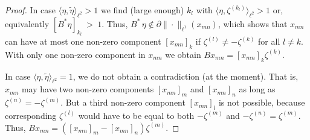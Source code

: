 \documentclass[10pt,a4paper]{amsart}
\begin{document}
\begin{proof}
\par
In case $\langle\eta,\tilde{\eta}\rangle_{\ell^2}>1$ we find (large enough) $k_l$ with $\langle\eta,\zeta^{(k_l)}\rangle_{\ell^2}>1$ or, equivalently $[B^\ast\eta]_{k_l}~>~1$. Thus, $B^\ast\,\eta\notin\partial\|\cdot\|_{\ell^1}(x_{mn})$, which shows that $x_{mn}$ can have at most one non-zero component $[x_{mn}]_k$ if $\zeta^{(l)}\neq-\zeta^{(k)}$ for all $l\neq k$. With only one non-zero component in $x_{mn}$ we obtain $Bx_{mn}=[x_{mn}]_k\zeta^{(k)}$.
\par
In case $\langle\eta,\tilde{\eta}\rangle_{\ell^2}=1$, we do not obtain a contradiction (at the moment). That is, $x_{mn}$ may have two non-zero components $[x_{mn}]_m$ and $[x_{mn}]_n$ as long as $\zeta^{(n)}=-\zeta^{(m)}$. But a third non-zero component $[x_{mn}]_l$ is not possible, because corresponding $\zeta^{(l)}$ would have to be equal to both $-\zeta^{(m)}$ and $-\zeta^{(n)}=\zeta^{(m)}$. Thus, $Bx_{mn}=([x_{mn}]_m-[x_{mn}]_n)\zeta^{(m)}$.
\end{proof}
\end{document}
